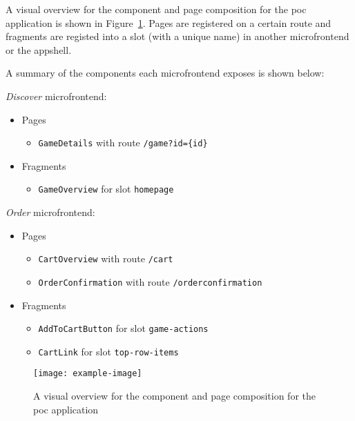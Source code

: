 A visual overview for the component and page composition for the \gls{poc}
application is shown in Figure~\ref{fig:poc-components}. Pages are registered on
a certain route and fragments are registed into a slot (with a unique name) in
another \gls{microfrontend} or the \gls{appshell}.

A summary of the components each \gls{microfrontend} exposes is shown below:
\begin{framed}
  \textit{Discover}  \gls{microfrontend}:
    \begin{itemize}
      \item[] Pages
      \begin{itemize}
        \item \texttt{GameDetails} with route \texttt{/game?id=\{id\}}
      \end{itemize}
      \item[] Fragments
      \begin{itemize}
        \item \texttt{GameOverview} for slot \texttt{homepage}
      \end{itemize}
    \end{itemize}
  \textit{Order} \gls{microfrontend}:
    \begin{itemize}
      \item[] Pages
      \begin{itemize}
        \item \texttt{CartOverview} with route \texttt{/cart}
        \item \texttt{OrderConfirmation} with route \texttt{/orderconfirmation}
      \end{itemize}
      \item[] Fragments
      \begin{itemize}
        \item \texttt{AddToCartButton} for slot \texttt{game-actions}
        \item \texttt{CartLink} for slot \texttt{top-row-items}
      \end{itemize}
    \end{itemize}
\end{framed} 


\begin{figure}
  \centering
  \texttt{[image: example-image]}  %
  \caption[Architecture overview for proof-of-concept solution]{A visual
  overview for the component and page composition for the \gls{poc}
  application}
  \label{fig:poc-components}
\end{figure}





